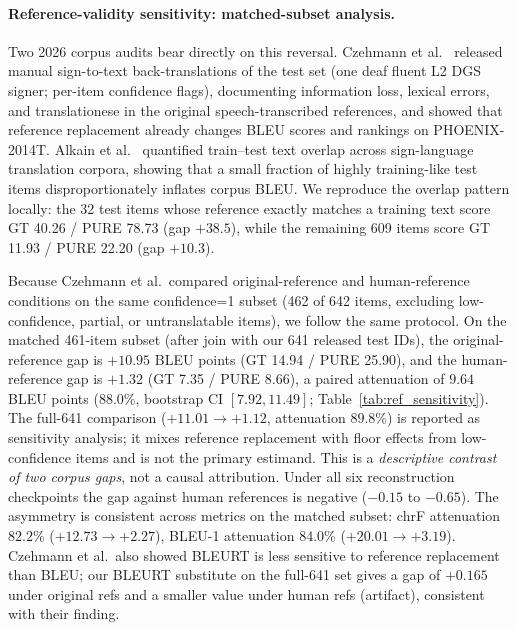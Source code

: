 \documentclass[pdflatex,sn-chicago]{sn-jnl}
\begin{document}
\paragraph{Reference-validity sensitivity: matched-subset analysis.}
\label{sec:human_refs}
\label{sec:floor_effect}
Two 2026 corpus audits bear directly on this reversal. Czehmann et al.~\cite{czehmann2026sacred} released manual sign-to-text back-translations of the test set (one deaf fluent L2 DGS signer; per-item confidence flags), documenting information loss, lexical errors, and translationese in the original speech-transcribed references, and showed that reference replacement already changes BLEU scores and rankings on PHOENIX-2014T. Alkain et al.~\cite{alkain2026critical} quantified train--test text overlap across sign-language translation corpora, showing that a small fraction of highly training-like test items disproportionately inflates corpus BLEU. We reproduce the overlap pattern locally: the 32 test items whose reference exactly matches a training text score GT 40.26 / PURE 78.73 (gap $+38.5$), while the remaining 609 items score GT 11.93 / PURE 22.20 (gap $+10.3$).

Because Czehmann et al.\ compared original-reference and human-reference conditions on the same confidence=1 subset (462 of 642 items, excluding low-confidence, partial, or untranslatable items), we follow the same protocol. On the matched 461-item subset (after join with our 641 released test IDs), the original-reference gap is $+10.95$ BLEU points (GT 14.94 / PURE 25.90), and the human-reference gap is $+1.32$ (GT 7.35 / PURE 8.66), a paired attenuation of $9.64$ BLEU points (88.0\%, bootstrap CI $[7.92, 11.49]$; Table~\ref{tab:ref_sensitivity}). The full-641 comparison ($+11.01 \to +1.12$, attenuation $89.8\%$) is reported as sensitivity analysis; it mixes reference replacement with floor effects from low-confidence items and is not the primary estimand. This is a \emph{descriptive contrast of two corpus gaps}, not a causal attribution. Under all six reconstruction checkpoints the gap against human references is negative ($-0.15$ to $-0.65$). The asymmetry is consistent across metrics on the matched subset: chrF attenuation $82.2\%$ ($+12.73 \to +2.27$), BLEU-1 attenuation $84.0\%$ ($+20.01 \to +3.19$). Czehmann et al.\ also showed BLEURT is less sensitive to reference replacement than BLEU; our BLEURT substitute on the full-641 set gives a gap of $+0.165$ under original refs and a smaller value under human refs (artifact), consistent with their finding.
\end{document}
